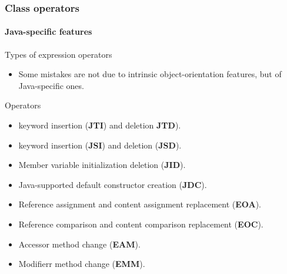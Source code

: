 \begin{frame}[hasprev=true, hasnext=false]
\frametitle{Class operators}
\framesubtitle{Java-specific features}


\begin{block:fact}{Types of expression operators}
\begin{itemize}
	\item Some mistakes are not due to intrinsic object-orientation features,
	but of Java-specific ones.
\end{itemize}
\end{block:fact}

\begin{block:fact}{Operators}
\begin{itemize}
	\item {} keyword insertion (\textbf{JTI}) and deletion
	\textbf{JTD}).
	\item {} keyword insertion (\textbf{JSI}) and deletion
	(\textbf{JSD}).
	\item Member variable initialization deletion (\textbf{JID}).
	\item Java-supported default constructor creation (\textbf{JDC}).
	\item Reference assignment and content assignment replacement
	(\textbf{EOA}).
	\item Reference comparison and content comparison replacement
	(\textbf{EOC}).
	\item Accessor method change (\textbf{EAM}).
	\item Modifierr method change (\textbf{EMM}).
\end{itemize}
\end{block:fact}
\end{frame}